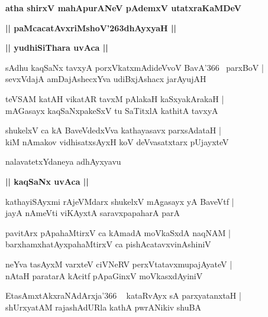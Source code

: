 \documentclass[twoside,12pt,openright]{book}
\def\S{\char'263}
\newcounter{shloka}[chapter]
\def\uvaca#1{\centerline{{\large\textbf{#1}}}}
\begin{document}
\begin{center}
{\LARGE\bfseries atha shirxV mahApurANeV pAdemxV utatxraKaMDeV}
\end{center}

\begin{center}
{\LARGE\bfseries || paMcacatAvxriMshoV\S dhAyxyaH ||}
\end{center}

\uvaca{|| yudhiSiThara uvAca ||}

\begin{shloka}%
sAdhu kaqSaNx tavxyA porxVkatxmAdideVvoV BavA\char'366 ~parxBoV |\\
sevxVdajA amDajAshecxYva udiBxjAshacx jarAyujAH 
\end{shloka}

\begin{shloka}%
teVSAM katAH vikatAR tavxM pAlakaH kaSxyakArakaH |\\
mAGasayx kaqSaNxpakeSxV tu SaTitxlA kathitA tavxyA
\end{shloka}

\begin{shloka}%
shukelxV ca kA BaveVdedxVva kathayasavx parxsAdataH |\\
kiM nAmakov vidhisatxsAyxH koV deVvasatxtarx pUjayxteV  
\end{shloka}

\begin{center}
nalavatetxYdaneya adhAyxyavu
\end{center}

\uvaca{|| kaqSaNx uvAca ||}

\begin{shloka}%
kathayiSAyxmi rAjeVMdarx shukelxV mAgasayx yA BaveVtf |\\
jayA nAmeVti viKAyxtA saravxpapaharA parA 
\end{shloka}

\begin{shloka}%
pavitArx pApahaMtirxV ca kAmadA moVkaSxdA naqNAM |\\
barxhamxhatAyxpahaMtirxV ca pishAcatavxvinAshiniV
\end{shloka}

\begin{shloka}%
neYva tasAyxM varxteV ciVNeRV perxVtatavxmupajAyateV |\\
nAtaH paratarA kAcitf pApaGinxV moVkasxdAyiniV 
\end{shloka}

\begin{shloka}%
EtasAmxtAkxraNAdArxja\char'366 ~ kataRvAyx sA parxyatanxtaH |\\
shUrxyatAM rajashAdURla kathA pwrANikiv shuBA
\end{shloka}
\end{document}
